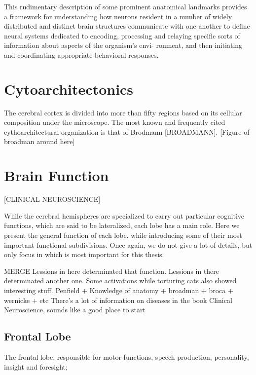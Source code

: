 This rudimentary description of some prominent anatomical landmarks
provides a framework for understanding how neurons resident in a number of widely distributed and distinct brain structures communicate with one another to define neural systems dedicated to encoding, processing and relaying specific sorts of information about aspects of the organism’s envi- ronment, and then initiating and coordinating appropriate behavioral responses.

\section{Cytoarchitectonics}
The cerebral cortex is divided into more than fifty regions based on its cellular composition under the microscope.
The most known and frequently cited cythoarchitectural organization is that of Brodmann [BROADMANN].
[Figure of broadman around here]

\section{Brain Function}
[CLINICAL NEUROSCIENCE]

While the cerebral hemispheres are specialized to carry out particular cognitive functions, which are said to be lateralized, each lobe has a main role.
Here we present the general function of each lobe, while introducing some of their most important functional subdivisions.
Once again, we do not give a lot of details, but only focus in which is most important for this thesis.

MERGE
Lessions in here
determinated that function. Lessions in there determinated another one.
Some activations while torturing cats also showed interesting stuff.
Penfield + Knowledge of anatomy + broadman + broca + wernicke + etc
There's a lot of information on diseases in the book Clinical Neuroscience,
sounds like a good place to start

\subsection{Frontal Lobe}
The frontal lobe, responsible for motor functions, speech production, personality, insight and foresight;

